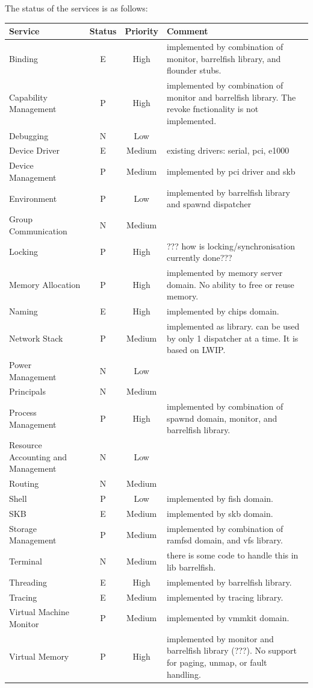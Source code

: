 \documentclass[a4paper,twoside]{report} %
\begin{document}
The status of the services is as follows:

\begin{tabularx}{\textwidth}{|l|c|c|X|}
\hline
Service & Status & Priority & Comment \\
\hline
Binding & E & High & implemented by combination of monitor, barrelfish
library, and flounder stubs. \\ 
\hline
Capability Management & P & High & implemented by combination of monitor and
barrelfish library. The revoke fnctionality is not implemented. \\ 
\hline
Debugging & N & Low & \\ 
\hline
Device Driver & E & Medium & existing drivers: serial, pci, e1000 \\ 
\hline
Device Management & P & Medium & implemented by pci driver and skb \\ 
\hline
Environment & P & Low & implemented by barrelfish library and spawnd
dispatcher \\
\hline
Group Communication & N & Medium \\ 
\hline
Locking & P & High & ??? how is locking/synchronisation currently done???\\ 
\hline
Memory Allocation & P & High & implemented by memory server domain. No
ability to free or reuse memory. \\ 
\hline
Naming & E & High & implemented by chips domain. \\ 
\hline
Network Stack & P & Medium & implemented as library. can be used by only 1
dispatcher at a time. It is based on LWIP. \\ 
\hline
Power Management & N & Low & \\ 
\hline
Principals & N & Medium & \\ 
\hline
Process Management & P & High & implemented by combination of spawnd domain,
monitor, and barrelfish library. \\ 
\hline
Resource Accounting and Management & N & Low & \\ 
\hline
Routing & N & Medium & \\ 
\hline
Shell & P & Low & implemented by fish domain.\\ 
\hline
SKB & E & Medium & implemented by skb domain. \\ 
\hline
Storage Management & P & Medium & implemented by combination of ramfsd domain,
and vfs library.\\  
\hline
Terminal & N & Medium & there is some code to handle this in lib
barrelfish. \\ 
\hline
Threading & E & High & implemented by barrelfish library. \\ 
\hline
Tracing & E & Medium & implemented by tracing library. \\ 
\hline
Virtual Machine Monitor & P & Medium & implemented by vmmkit domain. \\ 
\hline
Virtual Memory & P & High & implemented by monitor and barrelfish library (???).
No support for paging, unmap, or fault handling. \\ 
\hline
\end{tabularx}
\end{document}
